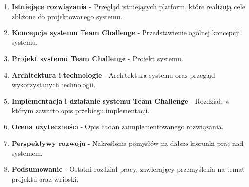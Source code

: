 \begin{comment}
W kolejnym rozdziale niniejszej pracy przedstawiono wybrane z istniejących platform (?). W trzecim rozdziale zawarto koncept rozwiązania. Czwarty rozdział obejmuje projekt systemu. Piąty rozdział przybliża architekturę systemu oraz technologie wybrane do jego budowy. W następnym, szóstym, rozdziale

O układzie pracy, przejście od przeglądu rozwiązań poprzez koncept, projekt techniczny aż do szczegółów implementacji oraz jej walidacji środowiskowej.

Następny rozdział niniejszej pracy zawiera przegląd istniejących platform, które realizują podobne cele do projektowanego systemu. Kolejne rozdziały dotyczą projektowanego systemu. W trzecim rozdziale zawarto projekt konceptualny. Czwarty rozdział obejmuje projekt techniczny systemu. W piątym rozdziale przybliżono 

\end{comment}

\begin{enumerate}

\item \textbf{Istniejące rozwiązania} - Przegląd istniejących platform, które realizują cele zbliżone do projektowanego systemu. \\

\item \textbf{Koncepcja systemu Team Challenge} - Przedstawienie ogólnej koncepcji systemu.   \\

\item \textbf{Projekt systemu Team Challenge} - Projekt systemu. \\

\item \textbf{Architektura i technologie} - Architektura systemu oraz przegląd wykorzystanych technologii.  \\

\item \textbf{Implementacja i działanie systemu Team Challenge} - Rozdział, w którym zawarto opis przebiegu implementacji.  \\

\item \textbf{Ocena użyteczności} - Opis badań zaimplementowanego rozwiązania.  \\

\item \textbf{Perspektywy rozwoju} - Nakreślenie pomysłów na dalsze kierunki prac nad systemem.  \\

\item \textbf{Podsumowanie} - Ostatni rozdział pracy, zawierający przemyślenia na temat projektu oraz wnioski.  \\

\end{enumerate}


